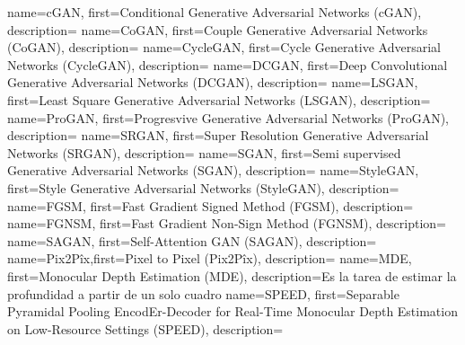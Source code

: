      {name={cGAN},       first={Conditional Generative Adversarial Networks (cGAN)},         description={}}
    {name={CoGAN},      first={Couple Generative Adversarial Networks (CoGAN)},             description={}}
 {name={CycleGAN},   first={Cycle Generative Adversarial Networks (CycleGAN)},           description={}}
    {name={DCGAN},      first={Deep Convolutional Generative Adversarial Networks (DCGAN)}, description={}}
    {name={LSGAN},      first={Least Square Generative Adversarial Networks (LSGAN)},       description={}}
   {name={ProGAN},     first={Progresvive Generative Adversarial Networks (ProGAN)},       description={}}
    {name={SRGAN},      first={Super Resolution Generative Adversarial Networks (SRGAN)},   description={}}
     {name={SGAN},       first={Semi supervised Generative Adversarial Networks (SGAN)},     description={}}
 {name={StyleGAN},   first={Style Generative Adversarial Networks (StyleGAN)},           description={}}
% 
     {name={FGSM},   first={Fast Gradient Signed Method (FGSM)},         description={}}
    {name={FGNSM},  first={Fast Gradient Non-Sign Method (FGNSM)},      description={}}
    {name={SAGAN},  first={Self-Attention GAN (SAGAN)},                 description={}}
  {name={Pix2Pîx},first={Pixel to Pixel (Pix2Pîx)},                   description={}}
      {name={MDE},    first={Monocular Depth Estimation (MDE)},           description={Es la tarea de estimar la profundidad a partir de un solo cuadro}}
    {name={SPEED},  first={Separable Pyramidal Pooling EncodEr-Decoder for Real-Time Monocular Depth Estimation on Low-Resource Settings (SPEED)},  description={}}


